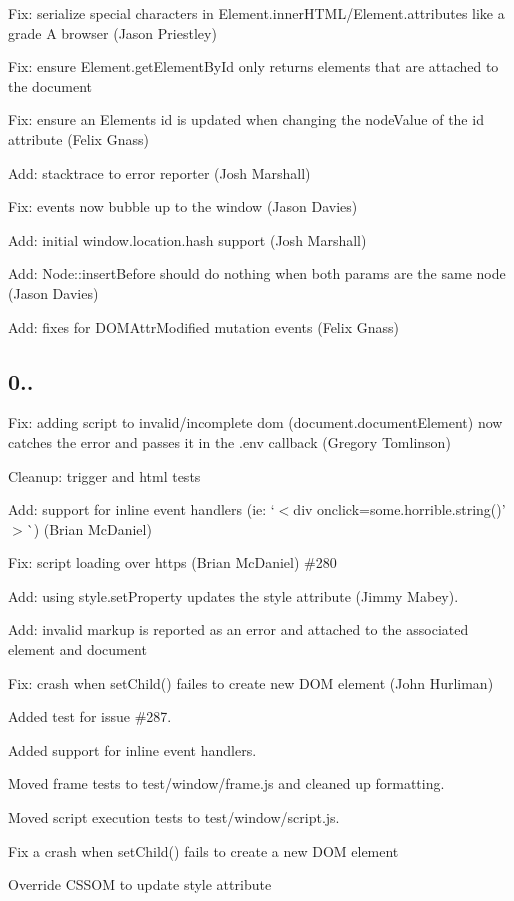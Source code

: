 \begin{DoxyItemize}
\item Fix\+: serialize special characters in Element.\+inner\+H\+T\+ML/\+Element.attributes like a grade A browser (Jason Priestley)
\item Fix\+: ensure Element.\+get\+Element\+By\+Id only returns elements that are attached to the document
\item Fix\+: ensure an Element\textquotesingle{}s id is updated when changing the node\+Value of the \textquotesingle{}id\textquotesingle{} attribute (Felix Gnass)
\item Add\+: stacktrace to error reporter (Josh Marshall)
\item Fix\+: events now bubble up to the window (Jason Davies)
\item Add\+: initial window.\+location.\+hash support (Josh Marshall)
\item Add\+: Node\+::insert\+Before should do nothing when both params are the same node (Jason Davies)
\item Add\+: fixes for D\+O\+M\+Attr\+Modified mutation events (Felix Gnass)
\end{DoxyItemize}

\subsection*{0..}


\begin{DoxyItemize}
\item Fix\+: adding script to invalid/incomplete dom (document.\+document\+Element) now catches the error and passes it in the {\ttfamily .env} callback (Gregory Tomlinson)
\item Cleanup\+: trigger and html tests
\item Add\+: support for inline event handlers (ie\+: `$<$div onclick=\textquotesingle{}some.\+horrible.\+string()'$>$\`{}) (Brian Mc\+Daniel)
\item Fix\+: script loading over https (Brian Mc\+Daniel) \#280
\item Add\+: using style.\+set\+Property updates the style attribute (Jimmy Mabey).
\item Add\+: invalid markup is reported as an error and attached to the associated element and document
\item Fix\+: crash when set\+Child() failes to create new D\+OM element (John Hurliman)
\item Added test for issue \#287.
\item Added support for inline event handlers.
\item Moved frame tests to test/window/frame.\+js and cleaned up formatting.
\item Moved script execution tests to test/window/script.\+js.
\item Fix a crash when set\+Child() fails to create a new D\+OM element
\item Override C\+S\+S\+OM to update style attribute
\end{DoxyItemize}

